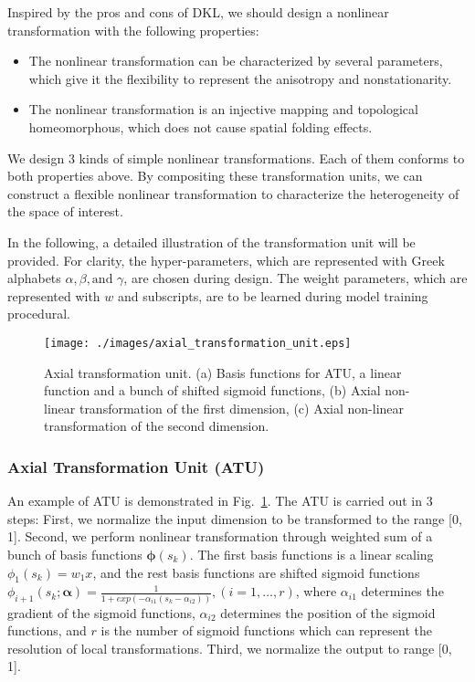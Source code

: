 \documentclass[journal, oneside, twocolumn]{IEEEtran}
\begin{document}
Inspired by the pros and cons of DKL, we should design a nonlinear transformation with the following properties:
\begin{itemize}
  \item The nonlinear transformation can be characterized by several parameters, which give it the flexibility to represent the anisotropy and nonstationarity.
  \item The nonlinear transformation is an injective mapping and topological homeomorphous, which does not cause spatial folding effects.
\end{itemize} 

We design 3 kinds of simple nonlinear transformations. Each of them conforms to both properties above. By compositing these transformation units, we can construct a flexible nonlinear transformation to characterize the heterogeneity of the space of interest. 

In the following, a detailed illustration of the transformation unit will be provided. For clarity, the hyper-parameters, which are represented with Greek alphabets $\alpha, \beta, \text{and } \gamma$, are chosen during design. The weight parameters, which are represented with $w$ and subscripts, are to be learned during model training procedural.

\begin{figure}[!tb]
  \centering
  \texttt{[image: ./images/axial\_transformation\_unit.eps]}
  \caption{Axial transformation unit. (a) Basis functions for ATU, a linear function and a bunch of shifted sigmoid functions, (b) Axial non-linear transformation of the first dimension, (c) Axial non-linear transformation of the second dimension.}
  \label{fig:axial_trans_unit}
\end{figure}


\subsubsection{Axial Transformation Unit (ATU)}
An example of ATU is demonstrated in Fig.~\ref{fig:axial_trans_unit}.
The ATU is carried out in 3 steps:
First, we normalize the input dimension to be transformed to the range [0, 1]. 
Second, we perform nonlinear transformation through weighted sum of a bunch of basis functions $\boldsymbol{\phi}(s_k)$. The first basis functions is a linear scaling $\phi_1(s_k) = w_1x$, and the rest basis functions are shifted sigmoid functions $\phi_{i+1}(s_k; \boldsymbol{\alpha}) = \frac{1}{1 + exp(-\alpha_{i1}(s_k - \alpha_{i2}))},(i=1,\dots, r)$, where $\alpha_{i1}$ determines the gradient of the sigmoid functions, $\alpha_{i2}$ determines the position of the sigmoid functions, and $r$ is the number of sigmoid functions which can represent the resolution of local transformations. Third, we normalize the output to range [0, 1].
\end{document}
